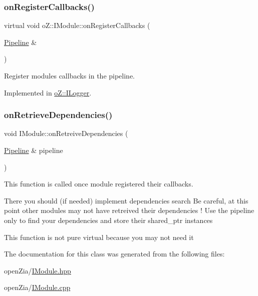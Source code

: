 \subsubsection{\texorpdfstring{onRegisterCallbacks()}{onRegisterCallbacks()}}
{\footnotesize\ttfamily virtual void o\+Z\+::\+I\+Module\+::on\+Register\+Callbacks (\begin{DoxyParamCaption}\item[{\mbox{\hyperlink{classo_z_1_1_pipeline}{Pipeline}} \&}]{ }\end{DoxyParamCaption})\hspace{0.3cm}{\ttfamily [pure virtual]}}



Register module\textquotesingle{}s callbacks in the pipeline. 



Implemented in \mbox{\hyperlink{classo_z_1_1_i_logger_a10732b6da6e8f085c6fe5fa154d361ef}{o\+Z\+::\+I\+Logger}}.

\mbox{\label{classo_z_1_1_i_module_af183d3711ef7d7a6966ac078b63a7685}} 
\subsubsection{\texorpdfstring{onRetrieveDependencies()}{onRetrieveDependencies()}}
{\footnotesize\ttfamily void I\+Module\+::on\+Retreive\+Dependencies (\begin{DoxyParamCaption}\item[{\mbox{\hyperlink{classo_z_1_1_pipeline}{Pipeline}} \&}]{pipeline }\end{DoxyParamCaption})\hspace{0.3cm}{\ttfamily [virtual]}}



This function is called once module registered their callbacks. 

There you should (if needed) implement dependencies search Be careful, at this point other modules may not have retreived their dependencies ! Use the pipeline only to find your dependencies and store their shared\+\_\+ptr instances

This function is not pure virtual because you may not need it 

The documentation for this class was generated from the following files\+:\begin{DoxyCompactItemize}
\item 
open\+Zia/\mbox{\hyperlink{_i_module_8hpp}{I\+Module.\+hpp}}\item 
open\+Zia/\mbox{\hyperlink{_i_module_8cpp}{I\+Module.\+cpp}}\end{DoxyCompactItemize}
